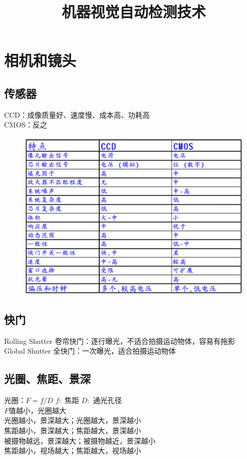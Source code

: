 \documentclass[11pt]{article}
\title{机器视觉自动检测技术}
\begin{document}
\maketitle

\section{相机和镜头}

\subsection{传感器}
CCD：成像质量好、速度慢、成本高、功耗高  \\
CMOS：反之
\begin{figure}[htb]
    \centering
    \includegraphics[scale=0.1]{imgs/CCD_CMOS.png}
\end{figure}

\subsection{快门}
Rolling Shutter 卷帘快门：逐行曝光，不适合拍摄运动物体，容易有拖影  \\
Global Shutter 全快门：一次曝光，适合拍摄运动物体

\subsection{光圈、焦距、景深}
光圈：$F=f/D$  \quad\quad $f:$ 焦距  \quad\quad  $D:$ 通光孔径  \\
$F$值越小，光圈越大  \\
光圈越小，景深越大；光圈越大，景深越小  \\
焦距越小，景深越大；焦距越大，景深越小  \\
被摄物越远，景深越大；被摄物越近，景深越小  \\
焦距越小，视场越大；焦距越大，视场越小
\end{document}
